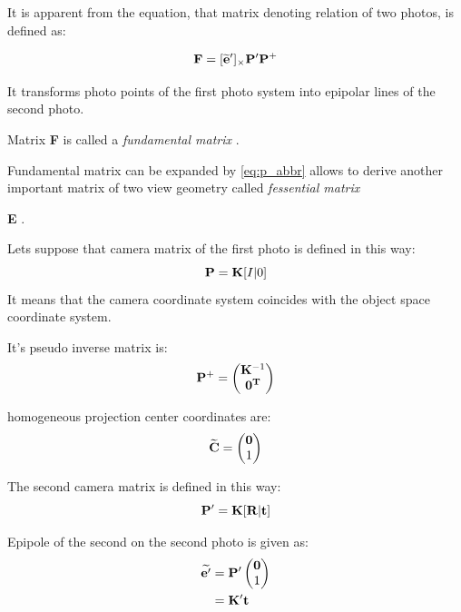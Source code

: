 \documentclass[a4paper,12pt]{article}
\newcommand{\ematr}[1]{
{\bf #1}
}
\newcommand{\evect}[1]{
{\bf #1}
}
\newcommand{\ehvect}[1]{
{\bf \widetilde{#1}}
}
\newcommand{\term}[1]{
{\it #1}
}
\begin{document}

It is apparent from the equation, that matrix denoting relation of two photos, is defined as:

\begin{equation}
\ematr{F}  = [\ehvect{e}']_{\times} \ematr{P'}\ematr{P}^{+}
\end{equation}

It transforms photo points of the first photo system into 
epipolar lines of the second photo.


Matrix \ematr{F} is called a \term{fundamental matrix}. 

Fundamental matrix can be expanded by \eqref{eq:p_abbr}
allows to derive another important matrix of two view geometry called \term{fessential matrix} \ematr{E}.

Lets suppose that camera matrix of the first photo is defined in this way:
\begin{equation}
\label{eq:rel_or_cam1}
\ematr{P}  = \ematr{K} \ematr{[}I|0\ematr{]}
\end{equation}
It means that the camera coordinate system coincides with  the object space coordinate 
system.

It's pseudo inverse matrix is:
\begin{equation}
\ematr{P}^{+} =
\begin{pmatrix}
   \ematr{K}^{-1} \\
   \evect{0^{T}} \\
\end{pmatrix}
\end{equation}

homogeneous projection center coordinates are:
\begin{equation}
\ehvect{C} =
\begin{pmatrix}
   \evect{0} \\
    1 \\
\end{pmatrix}
\end{equation}

The second camera matrix is defined in this way:
\begin{equation}
\label{eq:rel_or_cam2}
\ematr{P}'  = \ematr{K} \ematr{[}\ematr{R}|\evect{t}\ematr{]}
\end{equation}


Epipole of the second on the second photo is given as:
\begin{equation}
\begin{split}
\label{eg:second_epipole}
\ehvect{e'} &=  \ematr{P'}
\begin{pmatrix}
   \evect{0} \\
    1 \\
\end{pmatrix} \\
&= \ematr{K}' \evect{t}\\
\end{split}
\end{equation}
\end{document}
